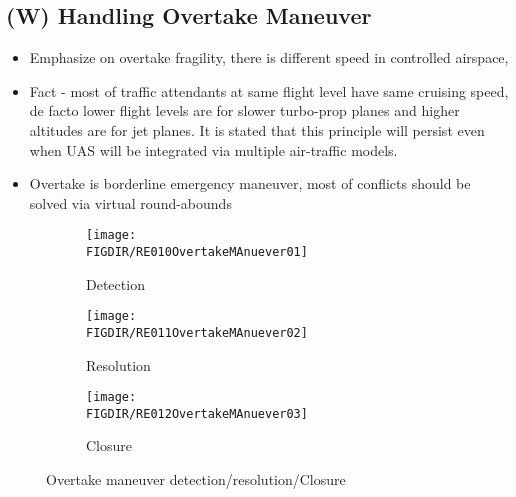 \subsection{(W) Handling Overtake Maneuver}\label{sec:handlingOvertakeManuever}
    \begin{itemize}
        \item Emphasize on overtake fragility, there is different speed in controlled airspace,
        \item Fact - most of traffic attendants at same flight level have same cruising speed, de facto lower flight levels are for slower turbo-prop planes and higher altitudes are for jet planes. It is stated that this principle will persist even when UAS will be integrated \cite{bayen2005langrangian,kopardekar2002dynamic,helme1992optimization} via multiple air-traffic models.
        \item Overtake is borderline emergency maneuver, most of conflicts should be solved via virtual round-abounds
    \end{itemize}
    \begin{figure}[H]
    	\centering
        \begin{subfigure}{0.32\textwidth}
            \texttt{[image: \\FIGDIR/RE010OvertakeMAnuever01]} 
            \caption{Detection}
            \label{fig:OvertakeManeuverTheoreticalDetection}
        \end{subfigure}
        \begin{subfigure}{0.32\textwidth}
            \texttt{[image: \\FIGDIR/RE011OvertakeMAnuever02]} 
            \caption{Resolution}
            \label{fig:OvertakeManeuverTheoreticalResolution}
        \end{subfigure}
        \begin{subfigure}{0.32\textwidth}
            \texttt{[image: \\FIGDIR/RE012OvertakeMAnuever03]} 
            \caption{Closure}
            \label{fig:OvertakeManeuverTheoreticalClosure}
        \end{subfigure}
        \caption{Overtake maneuver detection/resolution/Closure}
        \label{fig:OvertakeManeuverTheoretical}
    \end{figure}



